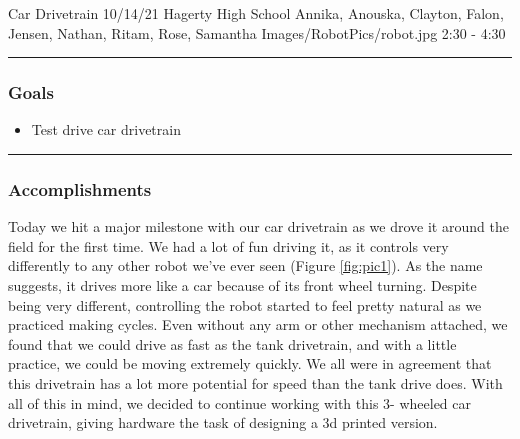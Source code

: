 \insertmeeting 
  {Car Drivetrain} 
  {10/14/21}
  {Hagerty High School}
  {Annika, Anouska, Clayton, Falon, Jensen, Nathan, Ritam, Rose, Samantha}
  {Images/RobotPics/robot.jpg}
  {2:30 - 4:30}
  
\noindent\hfil\rule{\textwidth}{.4pt}\hfil
\subsubsection*{Goals}
\begin{itemize}
    \item Test drive car drivetrain  

\end{itemize} 

\noindent\hfil\rule{\textwidth}{.4pt}\hfil

\subsubsection*{Accomplishments}
Today we hit a major milestone with our car drivetrain as we drove it around the field for the first time. We had a lot of fun driving it, as it controls very differently to any other robot we’ve ever seen (Figure \ref{fig:pic1}). As the name suggests, it drives more like a car because of its front wheel turning. Despite being very different, controlling the robot started to feel pretty natural as we practiced making cycles. Even without any arm or other mechanism attached, we found that we could drive as fast as the tank drivetrain, and with a little practice, we could be moving extremely quickly. We all were in agreement that this drivetrain has a lot more potential for speed than the tank drive does. With all of this in mind, we decided to continue working with this 3- wheeled car drivetrain, giving hardware the task of designing a 3d printed version.

